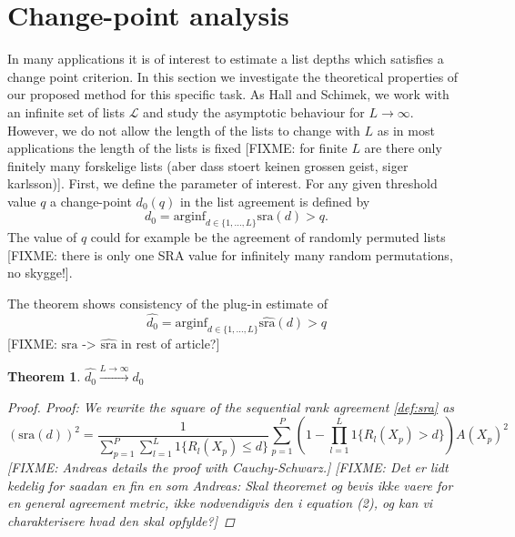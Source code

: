 \documentclass[12pt,a4paper]{article}
\theoremstyle{plain}
\newtheorem{theorem}{Theorem}
\begin{document}
\section{Change-point analysis}

In many applications it is of interest to estimate a list depths which
satisfies a change point criterion. In this section we investigate the
theoretical properties of our proposed method for this specific
task. As Hall and Schimek, we work with an infinite set of lists
$\mathcal{L}$ and study the asymptotic behaviour for
$L\to\infty$. However, we do not allow the length of the lists to
change with $L$ as in most applications the length of the lists is
fixed [FIXME: for finite $L$ are there only finitely many forskelige
lists (aber dass stoert keinen grossen geist, siger karlsson)]. First,
we define the parameter of interest. For any given threshold value $q$
a change-point $d_0(q)$ in the list agreement is defined by
\begin{equation*}
  d_0=\textrm{arginf}_{d\in\{1,\dots,L\}}\textrm{sra}(d)>q.
\end{equation*}
The value of $q$ could for example be the agreement of randomly
permuted lists [FIXME: there is only one SRA value for infinitely many
random permutations, no skygge!].


The theorem shows consistency of the plug-in estimate of
\begin{equation*}
\hat{d_0} = \textrm{arginf}_{d\in\{1,\dots,L\}}\widehat{\textrm{sra}}(d)>q
\end{equation*}
[FIXME: $\textrm{sra}$ -> $\widehat{\textrm{sra}}$ in rest of article?]

\begin{theorem}
  $\hat{d_0}\overset{L\to\infty}{\longrightarrow}d_0$

\begin{proof}
Proof: We rewrite the square of the sequential rank agreement \eqref{def:sra} as
\begin{equation}
(\textrm{sra}(d))^2= \frac 1{\sum_{p=1}^P \sum_{l=1}^L 1\{R_l(X_p)\le d\}}\sum_{p=1}^P(1-\prod_{l=1}^L 1\{R_l(X_p)>d\}) A(X_p)^2
\end{equation}
[FIXME: Andreas details the proof with Cauchy-Schwarz.]
[FIXME: Det er lidt kedelig for saadan en fin en som Andreas: Skal theoremet og bevis ikke vaere for en general agreement metric, ikke nodvendigvis den i equation (2), og kan vi charakterisere hvad den skal opfylde?]
\end{proof}
\end{theorem}
\end{document}
